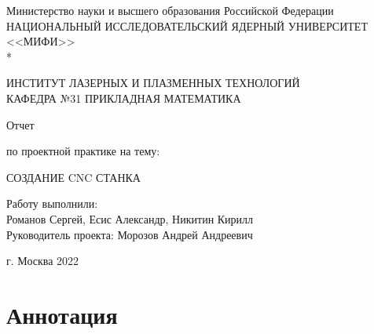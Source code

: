 \documentclass[a4paper,12pt]{article}
\theoremstyle{plain}                          %
\theoremstyle{definition}                     %
\theoremstyle{remark}                         %
\begin{document}
\renewcommand{\contentsname}{\Large Содержание}
\renewcommand{\bibname}{\normalfont\Large\bfseries Список литературы}

\begin{titlepage}
    \begin{center}
        Министерство науки и высшего образования Российской Федерации \\
        НАЦИОНАЛЬНЫЙ ИССЛЕДОВАТЕЛЬСКИЙ ЯДЕРНЫЙ УНИВЕРСИТЕТ <<МИФИ>> \\*
        \hrulefill
    \end{center}

    \begin{center}
        ИНСТИТУТ ЛАЗЕРНЫХ И ПЛАЗМЕННЫХ ТЕХНОЛОГИЙ\\
        КАФЕДРА №31 ПРИКЛАДНАЯ МАТЕМАТИКА
    \end{center}
    \vspace{1cm}

    \vspace{2em}

    \begin{center}
        \large{Отчет}

        по проектной практике на тему:
    \end{center}

    \begin{center}
        \large СОЗДАНИЕ CNC СТАНКА
    \end{center}

    \vspace{20em}

    \begin{flushright}
        Работу выполнили: \\ Романов Сергей, Есис Александр, Никитин Кирилл\\
        Руководитель проекта: Морозов Андрей Андреевич
    \end{flushright}

    \vspace{5em}

    \begin{center}
        г. Москва 2022
    \end{center}
\end{titlepage}

\newpage
\tableofcontents
\setcounter{page}{3}

\newpage
\section*{Аннотация}
\end{document}
